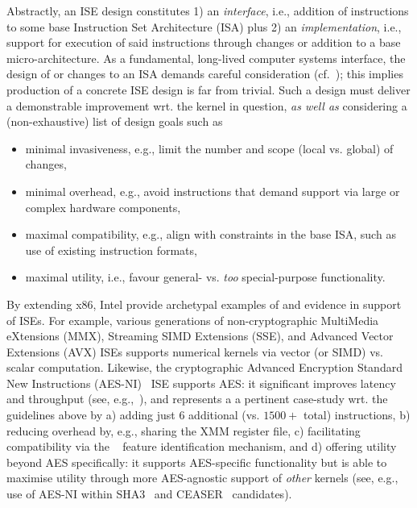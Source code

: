 Abstractly, an ISE design constitutes
1) an {\em interface},
   i.e., 
   addition of instructions to some 
   base Instruction Set Architecture (ISA) 
   plus
2) an {\em implementation},
   i.e., 
   support for execution of said instructions through changes or addition 
   to a 
   base micro-architecture.
As a fundamental, long-lived computer systems interface, the design of or
changes to an ISA demands careful consideration
(cf.~\cite[Section 4]{Gueron:09}); this implies production of a concrete 
ISE design is far from trivial.  
Such a design must deliver a demonstrable improvement wrt. the kernel in 
question, {\em as well as} considering a (non-exhaustive) list of design 
goals such as

\begin{itemize}
\item minimal invasiveness,
      e.g.,
      limit the number and scope (local vs. global) of changes,
\item minimal overhead,
      e.g.,
      avoid instructions that demand support via large or complex hardware components,
\item maximal compatibility,
      e.g.,
      align with constraints in the base ISA, such as use of existing instruction formats,
\item maximal       utility,
      i.e.,
      favour general- vs. {\em too} special-purpose functionality.
\end{itemize}

\noindent
By extending x86, Intel provide archetypal examples of and evidence in
support of ISEs.
For example, various generations of
non-cryptographic
MultiMedia      eXtensions (MMX),
Streaming SIMD  Extensions (SSE),
and
Advanced Vector Extensions (AVX)
ISEs
supports numerical kernels via vector (or SIMD) vs. scalar computation.  
Likewise, the
    cryptographic
Advanced Encryption Standard New Instructions (AES-NI)~\cite{Gueron:09,DruGueKra:19}
ISE
supports AES: it significant improves latency and throughput
(see, e.g.,~\cite{FazLopOli:18}),
and represents a a pertinent case-study wrt. the guidelines above by
a) adding just $6$ additional (vs. $1500+$ total) instructions,
b) reducing overhead by, e.g., sharing the XMM register file,
c) facilitating compatibility via the
   ~\cite[Chapter 20]{X86:1:18}
   feature identification mechanism,
   and
d) offering utility beyond AES specifically:
   it supports AES-specific functionality but is able to maximise utility 
   through more AES-agnostic support of {\em other} kernels
   (see, e.g., use of AES-NI within SHA3~\cite{BBGR:09} and CEASER~\cite[Section 4.1]{AnkAnk:16} candidates).

